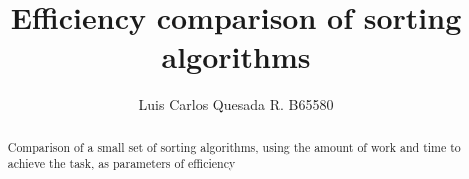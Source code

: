 \documentclass[twocolumn,english,journal]{IEEEtran}
\begin{document}
\title{Efficiency comparison of sorting algorithms}
\author{Luis Carlos Quesada R.	B65580}
\maketitle

\begin{abstract}
Comparison of a small set of sorting algorithms, using the amount of work and time to achieve the task, as parameters of efficiency
\end{abstract}
\end{document}
